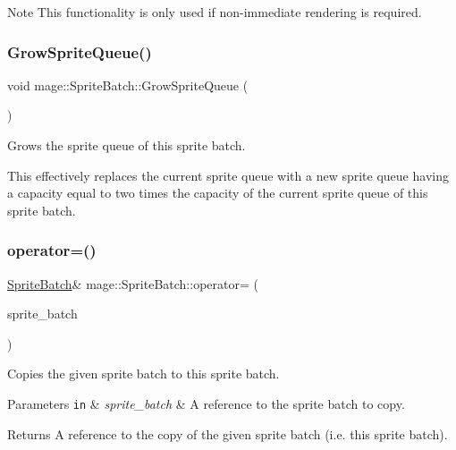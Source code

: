\begin{DoxyNote}{Note}
This functionality is only used if non-\/immediate rendering is required. 
\end{DoxyNote}
\hypertarget{classmage_1_1_sprite_batch_a7e12144793e4a69c2f9eb7aea9326049}{}\label{classmage_1_1_sprite_batch_a7e12144793e4a69c2f9eb7aea9326049} 
\subsubsection{\texorpdfstring{Grow\+Sprite\+Queue()}{GrowSpriteQueue()}}
{\footnotesize\ttfamily void mage\+::\+Sprite\+Batch\+::\+Grow\+Sprite\+Queue (\begin{DoxyParamCaption}{ }\end{DoxyParamCaption})\hspace{0.3cm}{\ttfamily [private]}}

Grows the sprite queue of this sprite batch.

This effectively replaces the current sprite queue with a new sprite queue having a capacity equal to two times the capacity of the current sprite queue of this sprite batch. \hypertarget{classmage_1_1_sprite_batch_aa2a5df588d7589a36b38b35dc8a08a48}{}\label{classmage_1_1_sprite_batch_aa2a5df588d7589a36b38b35dc8a08a48} 
\subsubsection{\texorpdfstring{operator=()}{operator=()}\hspace{0.1cm}{\footnotesize\ttfamily [1/2]}}
{\footnotesize\ttfamily \hyperlink{classmage_1_1_sprite_batch}{Sprite\+Batch}\& mage\+::\+Sprite\+Batch\+::operator= (\begin{DoxyParamCaption}\item[{const \hyperlink{classmage_1_1_sprite_batch}{Sprite\+Batch} \&}]{sprite\+\_\+batch }\end{DoxyParamCaption})\hspace{0.3cm}{\ttfamily [delete]}}

Copies the given sprite batch to this sprite batch.


\begin{DoxyParams}[1]{Parameters}
\mbox{\tt in}  & {\em sprite\+\_\+batch} & A reference to the sprite batch to copy. \\
\hline
\end{DoxyParams}
\begin{DoxyReturn}{Returns}
A reference to the copy of the given sprite batch (i.\+e. this sprite batch). 
\end{DoxyReturn}
\hypertarget{classmage_1_1_sprite_batch_ad46c172200bf47c10fa13fb3a70a4104}{}\label{classmage_1_1_sprite_batch_ad46c172200bf47c10fa13fb3a70a4104} 
